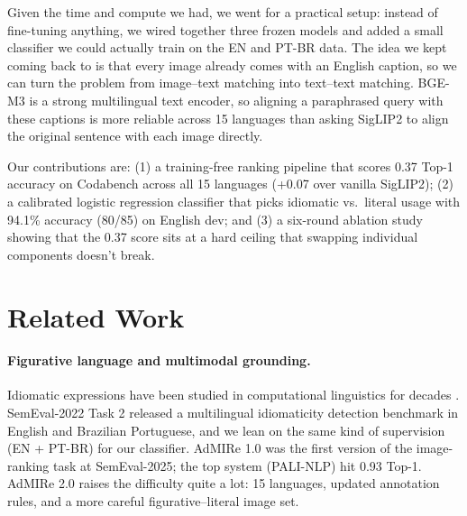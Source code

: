 \documentclass[11pt]{article}
\begin{document}
Given the time and compute we had, we went for a practical setup: instead of
fine-tuning anything, we wired together three frozen models and added a small
classifier we could actually train on the EN and PT-BR data. The idea we kept
coming back to is that every image already comes with an English caption, so we
can turn the problem from image--text matching into text--text matching. BGE-M3
\cite{chen2024bge} is a strong multilingual text encoder, so aligning a
paraphrased query with these captions is more reliable across 15 languages than
asking SigLIP2 to align the original sentence with each image directly.

Our contributions are: (1) a training-free ranking pipeline that scores 0.37
Top-1 accuracy on Codabench across all 15 languages (+0.07 over vanilla
SigLIP2); (2) a calibrated logistic regression classifier that picks idiomatic
vs.\ literal usage with 94.1\% accuracy (80/85) on English dev; and (3) a
six-round ablation study showing that the 0.37 score sits at a hard ceiling
that swapping individual components doesn't break.

\section{Related Work}

\paragraph{Figurative language and multimodal grounding.}
Idiomatic expressions have been studied in computational linguistics for
decades \cite{nunberg1994idioms,sag2002multiword}. SemEval-2022 Task 2
\cite{tayyarmadabushi2022semeval} released a multilingual idiomaticity
detection benchmark in English and Brazilian Portuguese, and we lean on the
same kind of supervision (EN + PT-BR) for our classifier. AdMIRe 1.0
\cite{semeval2025admire1} was the first version of the image-ranking task at
SemEval-2025; the top system (PALI-NLP) hit 0.93 Top-1. AdMIRe 2.0 raises the
difficulty quite a lot: 15 languages, updated annotation rules, and a more
careful figurative--literal image set.
\end{document}
